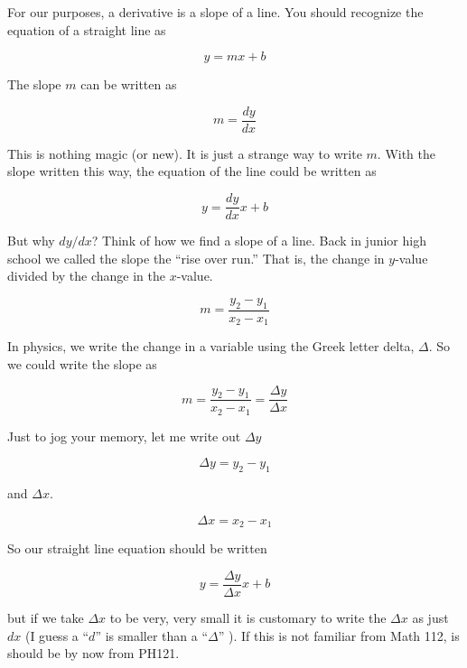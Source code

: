 For our purposes, a derivative is a slope of a line. You should recognize the equation of a straight line as

\begin{equation*}
	y=mx+b
\end{equation*}

The slope $m$ can be written as 

\begin{equation*}
	m=\frac{dy}{dx}
\end{equation*}

This is nothing magic (or new). It is just a strange way to write $m.$ With the slope written this way, the equation of the line could be written as 

\begin{equation*}
	y=\frac{dy}{dx}x+b
\end{equation*}

But why $dy/dx$? Think of how we find a slope of a line. Back in junior high
school we called the slope the ``rise over run.'' That is, the change in $y$-value divided by the
change in the $x$-value.

\begin{equation*}
	m=\frac{y_{2}-y_{1}}{x_{2}-x_{1}}
\end{equation*}

In physics, we write the change in a variable using the Greek letter delta, $\Delta .$ So we could write the slope as

\begin{equation*}
	m=\frac{y_{2}-y_{1}}{x_{2}-x_{1}}=\frac{\Delta y}{\Delta x}
\end{equation*}

Just to jog your memory, let me write out $\Delta y$

\begin{equation*}
	\Delta y=y_{2}-y_{1}
\end{equation*}

and $\Delta x.$ 

\begin{equation*}
	\Delta x=x_{2}-x_{1}
\end{equation*}

So our straight line equation should be written 

\begin{equation*}
	y=\frac{\Delta y}{\Delta x}x+b
\end{equation*}

but if we take $\Delta x$ to be very, very small it is customary to write the $\Delta x$ as just $dx$ (I guess a ``$d$'' is smaller than a ``$\Delta $'' ). If this is not familiar from Math 112, is should be by now from PH121.

